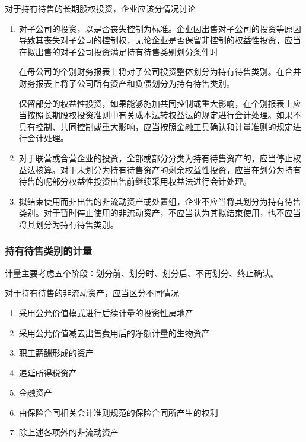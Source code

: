 \documentclass[UTF8,12pt]{ctexart}
\numberwithin{equation}{section} %
\numberwithin{figure}{section}
\numberwithin{table}{section}
\begin{document}
	对于持有待售的长期股权投资，企业应该分情况讨论
	\begin{enumerate}
		\item 对子公司的投资，以是否丧失控制为标准。企业因出售对子公司的投资等原因导致其丧失对子公司的控制权，无论企业是否保留非控制的权益性投资，应当在拟出售的对子公司投资满足持有待售类别划分条件时
		
		在母公司的个别财务报表上将对子公司投资整体划分为持有待售类别。在合并财务报表上将子公司所有资产和负债划分为持有待售类别。
		
		保留部分的权益性投资，如果能够施加共同控制或重大影响，在个别报表上应当按照长期股权投资准则中有关成本法转权益法的规定进行会计处理。如果不具有控制、共同控制或重大影响，应当按照金融工具确认和计量准则的规定进行会计处理。
		
		\item 对于联营或合营企业的投资，全部或部分分类为持有待售资产的，应当停止权益法核算。对于未划分为持有待售资产的剩余权益性投资，应当在划分为持有待售的呢部分权益性投资出售前继续采用权益法进行会计处理。
		
		\item 拟结束使用而非出售的非流动资产或处置组，企业不应当将其划分为持有待售类别。对于暂时停止使用的非流动资产，不应当认为其拟结束使用，也不应当将其划分为持有待售类别。
	\end{enumerate}

	\subsubsection{持有待售类别的计量}
	计量主要考虑五个阶段：划分前、划分时、划分后、不再划分、终止确认。
	
	对于持有待售的非流动资产，应当区分不同情况
	\begin{enumerate}
		\item 采用公允价值模式进行后续计量的投资性房地产
		
		\item 采用公允价值减去出售费用后的净额计量的生物资产
		
		\item 职工薪酬形成的资产
		
		\item 递延所得税资产
		
		\item 金融资产
		
		\item 由保险合同相关会计准则规范的保险合同所产生的权利
		
		\item 除上述各项外的非流动资产
	\end{enumerate}
	
\end{document}
